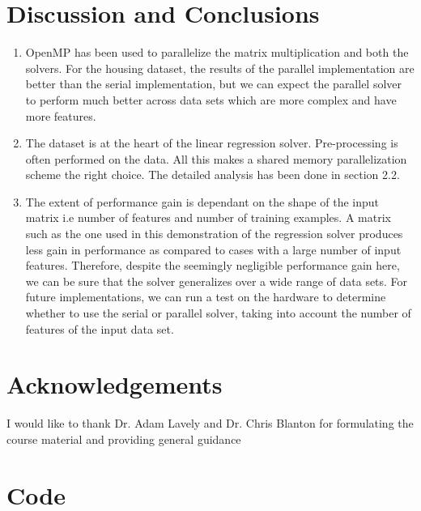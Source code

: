 \documentclass{article}
\begin{document}
\begin{spacing}{1.1}
\section{Discussion and Conclusions}

\begin{enumerate}
    \item OpenMP has been used to parallelize the matrix multiplication and both the solvers. For the housing dataset, the results of the parallel implementation are better than the serial implementation, but we can expect the parallel solver to perform much better across data sets which are more complex and have more features.
    \item The dataset is at the heart of the linear regression solver. Pre-processing is often performed on the data. All this makes a shared memory parallelization scheme the right choice. The detailed analysis has been done in section 2.2. 
    \item The extent of performance gain is dependant on the shape of the input matrix i.e number of features and number of training examples. A matrix such as the one used in this demonstration of the regression solver produces less gain in performance as compared to cases with a large number of input features. Therefore, despite the seemingly negligible performance gain here, we can be sure that the solver generalizes over a wide range of data sets. For future implementations, we can run a test on the hardware to determine whether to use the serial or parallel solver, taking into account the number of features of the input data set.  
\end{enumerate}

\newpage
\begin{appendices}

\section{Acknowledgements}

I would like to thank Dr. Adam Lavely and Dr. Chris Blanton for formulating the course material and providing general guidance

\section{Code}


\end{appendices}
\end{spacing}
\end{document}
